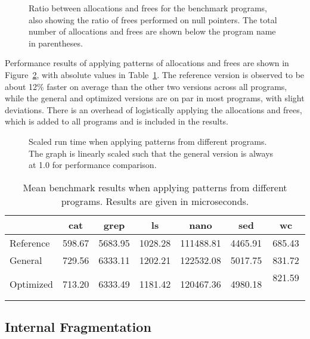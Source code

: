 \begin{figure}[h]
    \centering
    
    \caption{Ratio between allocations and frees for the benchmark programs, also showing the ratio of frees performed on null pointers. The total number of allocations and frees are shown below the program name in parentheses.}
    \label{fig:program_ratios}
\end{figure}

Performance results of applying patterns of allocations and frees are shown in Figure~\ref{fig:program_benchmarks}, with absolute values in Table~\ref{table:program_benchmarks}. The reference version is observed to be about 12\% faster on average than the other two versions across all programs, while the general and optimized versions are on par in most programs, with slight deviations. There is an overhead of logistically applying the allocations and frees, which is added to all programs and is included in the results.

\begin{figure}[]
    \centering
    
    \caption{Scaled run time when applying patterns from different programs. The graph is linearly scaled such that the general version is always at 1.0 for performance comparison.}
    \label{fig:program_benchmarks}
\end{figure}

\begin{table}[]
    \centering
    \begin{tabular}{p{3.44cm}|cccccc}
    {} & {cat} & {grep} & {ls} & {nano} & {sed} & {wc} \\
    \hline
    Reference & 598.67 & 5683.95 & 1028.28 & 111488.81 & 4465.91 & 685.43 \\
    General   & 729.56 & 6333.11 & 1202.21 & 122532.08 & 5017.75 & 831.72 \\
    Optimized & 713.20 & 6333.49 & 1181.42 & 120467.36 & 4980.18 & 821.59 \
    \end{tabular}
    \caption{Mean benchmark results when applying patterns from different programs. Results are given in microseconds.}
    \label{table:program_benchmarks}
\end{table}

\subsection{Internal Fragmentation}

